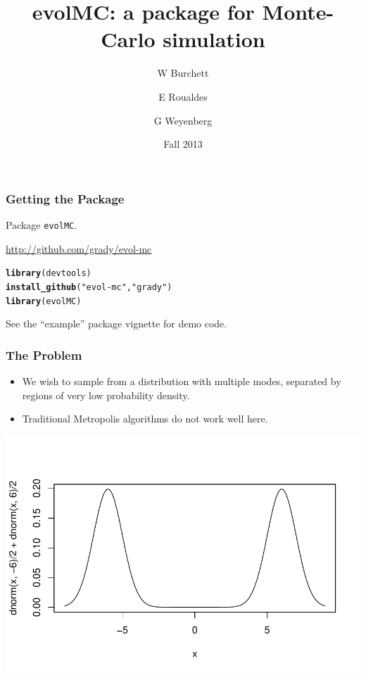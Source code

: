 \documentclass{beamer}\usepackage[]{graphicx}\usepackage[]{color}
\title{evolMC: a package for Monte-Carlo simulation}
\author{W Burchett \and E Roualdes \and G Weyenberg}
\date{Fall 2013}
\makeatletter
\newcommand{\hlstr}[1]{\textcolor[rgb]{0.192,0.494,0.8}{#1}}%
\newcommand{\hlstd}[1]{\textcolor[rgb]{0.345,0.345,0.345}{#1}}%
\newcommand{\hlkwd}[1]{\textcolor[rgb]{0.737,0.353,0.396}{\textbf{#1}}}%
\newenvironment{kframe}{%
 \def\at@end@of@kframe{}%
 \ifinner\ifhmode%
  \def\at@end@of@kframe{\end{minipage}}%
  \begin{minipage}{\columnwidth}%
 \fi\fi%
 \def\FrameCommand##1{\hskip\@totalleftmargin \hskip-\fboxsep
 \colorbox{shadecolor}{##1}\hskip-\fboxsep
     \hskip-\linewidth \hskip-\@totalleftmargin \hskip\columnwidth}%
 \MakeFramed {\advance\hsize-\width
   \@totalleftmargin\z@ \linewidth\hsize
   \@setminipage}}%
 {\par\unskip\endMakeFramed%
 \at@end@of@kframe}
\newenvironment{knitrout}{}{} %
\makeatother
\begin{document}
\begin{frame}
\maketitle
\end{frame}

\begin{frame}[fragile]
  \frametitle{Getting the Package}
  Package {\tt evolMC}.
 
  \url{http://github.com/grady/evol-mc}
\begin{knitrout}
\color{fgcolor}\begin{kframe}
\begin{alltt}
\hlkwd{library}\hlstd{(devtools)}
\hlkwd{install_github}\hlstd{(}\hlstr{"evol-mc"}\hlstd{,} \hlstr{"grady"}\hlstd{)}
\hlkwd{library}\hlstd{(evolMC)}
\end{alltt}
\end{kframe}
\end{knitrout}

See the ``example'' package vignette for demo code.
\end{frame}

\begin{frame}
  \frametitle{The Problem}
  \begin{itemize}
  \item We wish to sample from a distribution with multiple modes, separated by regions of very low probability density.

    \item Traditional Metropolis algorithms do not work well here.
      

  \end{itemize}
\begin{center}
\includegraphics[scale=0.6]{figure/bimodal}  
\end{center}
\end{frame}
\end{document}
